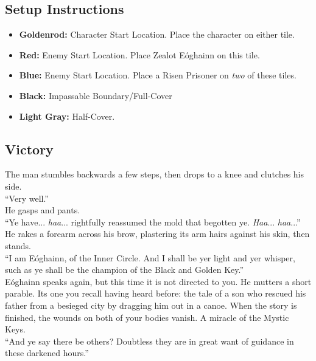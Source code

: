 \subsection*{Setup Instructions}
\begin{itemize}
\item \textbf{Goldenrod:} Character Start Location. Place the character on either tile.
\item \textbf{Red:} Enemy Start Location. Place Zealot Eóghainn on this tile.
\item \textbf{Blue:} Enemy Start Location. Place a Risen Prisoner on \emph{two} of these tiles.
\item \textbf{Black:} Impassable Boundary/Full-Cover
\item \textbf{Light Gray:} Half-Cover.
\end{itemize}

\pagebreak

\subsection*{Victory}
The man stumbles backwards a few steps, then drops to a knee and clutches his side.\\

“Very well.”\\

He gasps and pants.\\
“Ye have... \emph{haa}... rightfully reassumed the mold that begotten ye. \emph{Haa}... \emph{haa}...”\\

He rakes a forearm across his brow, plastering its arm hairs against his skin, then stands.\\

“I am Eóghainn, of the Inner Circle. And I shall be yer light and yer whisper, such as ye shall be the champion of the Black and Golden Key.”\\

Eóghainn speaks again, but this time it is not directed to you. He mutters a short parable. Its one you recall having heard before: the tale of a son who rescued his father from a besieged city by dragging him out in a canoe. When the story is finished, the wounds on both of your bodies vanish. A miracle of the Mystic Keys.\\

“And ye say there be others? Doubtless they are in great want of guidance in these darkened hours.”\\

